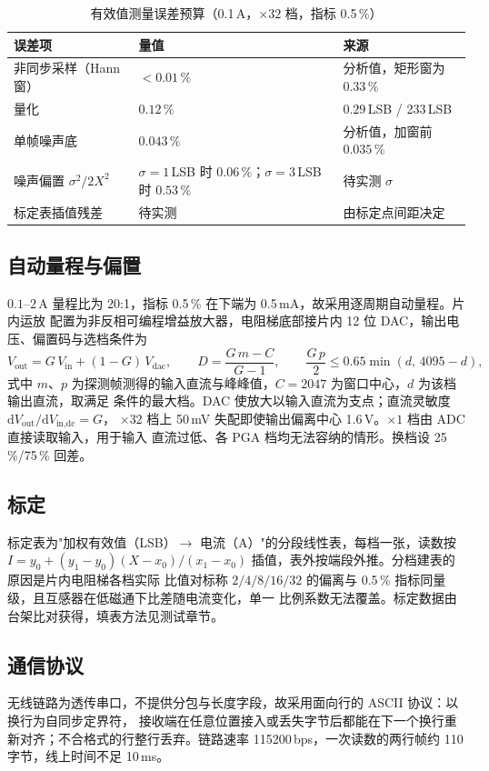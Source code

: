 \documentclass[12pt]{article}
\newcommand{\wuhao}{\fontsize{10.5pt}{15pt}\selectfont}
\begin{document}
\begin{table}[htbp]\centering
\caption{有效值测量误差预算（0.1\,A，$\times32$ 档，指标 0.5\,\%）}
\label{tab:budget}
\wuhao
\begin{tabular}{lll}
\toprule
误差项 & 量值 & 来源\\
\midrule
非同步采样（Hann 窗） & $<0.01\,\%$ & 分析值，矩形窗为 $0.33\,\%$\\
量化                  & $0.12\,\%$  & $0.29$\,LSB / 233\,LSB\\
单帧噪声底            & $0.043\,\%$ & 分析值，加窗前 $0.035\,\%$\\
噪声偏置 $\sigma^2/2X^2$ & $\sigma=1$\,LSB 时 $0.06\,\%$；$\sigma=3$\,LSB 时 $0.53\,\%$ & 待实测 $\sigma$\\
标定表插值残差        & 待实测 & 由标定点间距决定\\
\bottomrule
\end{tabular}
\end{table}

\subsection{自动量程与偏置}
$0.1\text{--}2$\,A 量程比为 20:1，指标 0.5\,\% 在下端为 0.5\,mA，故采用逐周期自动量程。片内运放
配置为非反相可编程增益放大器，电阻梯底部接片内 12 位 DAC，输出电压、偏置码与选档条件为
\begin{equation}
  V_{\text{out}} = G\,V_{\text{in}} + (1-G)\,V_{\text{dac}},\qquad
  D=\frac{G\,m-C}{G-1},\qquad
  \frac{G\,p}{2}\le 0.65\min(d,\,4095-d),
\end{equation}
式中 $m$、$p$ 为探测帧测得的输入直流与峰峰值，$C=2047$ 为窗口中心，$d$ 为该档输出直流，取满足
条件的最大档。DAC 使放大以输入直流为支点；直流灵敏度 $\mathrm{d}V_{\text{out}}/\mathrm{d}V_{\text{in,dc}}=G$，
$\times32$ 档上 50\,mV 失配即使输出偏离中心 1.6\,V。$\times1$ 档由 ADC 直接读取输入，用于输入
直流过低、各 PGA 档均无法容纳的情形。换档设 25\,\%/75\,\% 回差。

\subsection{标定}
标定表为"加权有效值（LSB）$\to$ 电流（A）"的分段线性表，每档一张，读数按
$I=y_0+(y_1-y_0)(X-x_0)/(x_1-x_0)$ 插值，表外按端段外推。分档建表的原因是片内电阻梯各档实际
比值对标称 $2/4/8/16/32$ 的偏离与 0.5\,\% 指标同量级，且互感器在低磁通下比差随电流变化，单一
比例系数无法覆盖。标定数据由台架比对获得，填表方法见测试章节。

\subsection{通信协议}
无线链路为透传串口，不提供分包与长度字段，故采用面向行的 ASCII 协议：以换行为自同步定界符，
接收端在任意位置接入或丢失字节后都能在下一个换行重新对齐；不合格式的行整行丢弃。链路速率
115200\,bps，一次读数的两行帧约 110 字节，线上时间不足 10\,ms。
\end{document}
